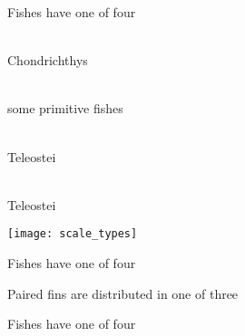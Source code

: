 \documentclass[t]{beamer}
\begin{document}


{
\begin{frame}[b,plain]
\end{frame}
}

\begin{frame}[t,plain]{Fishes have one of four }
	\begin{minipage}{0.3\textwidth}
	\raggedright
	
	\\{\small Chondrichthys}
	
	\vspace{2em}

	\\ {\small some primitive fishes}
	
	\vspace{2em}
	
	\\ {\small Teleostei}
	
	\vspace{2em}
	
	 \\{\small Teleostei}

	\vspace{2em}
	
	\end{minipage}\hfill\begin{minipage}{0.6\textwidth}

		\texttt{[image: scale\_types]}
	\end{minipage}
\end{frame}

{
\begin{frame}[b,plain]{Fishes have one of four }
\end{frame}
}

{
\begin{frame}[b,plain]{Paired fins are distributed in one of three }
\end{frame}
}

{
\begin{frame}[b,plain]{Fishes have one of four }
\end{frame}
}
\end{document}
